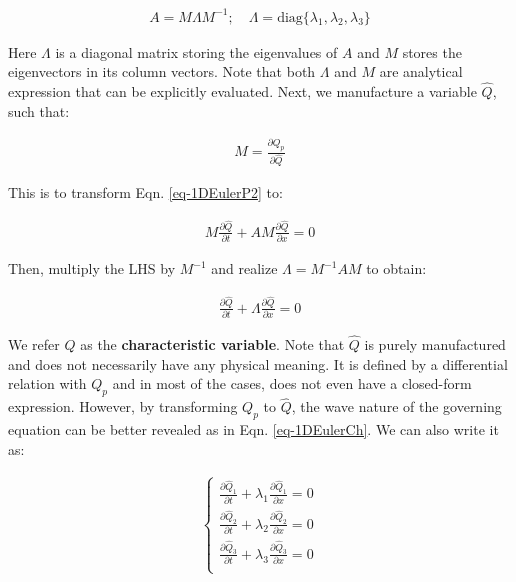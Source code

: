 \documentclass[12pt, letterpaper]{report}
\begin{document}
\begin{align*}
   A = M \Lambda M^{-1}; \quad \Lambda = \textrm{diag}\{\lambda_1, \lambda_2, \lambda_3\}
\end{align*}

Here $\Lambda$ is a diagonal matrix storing the eigenvalues of $A$ and $M$ stores the eigenvectors
in its column vectors. Note that both $\Lambda$ and $M$ are analytical expression that can be
explicitly evaluated. Next, we manufacture a variable $\widehat{Q}$, such that:

\begin{align*}
   M = \frac{\partial Q_p}{\partial \widehat{Q}}
\end{align*}

This is to transform Eqn. \ref{eq-1DEulerP2} to:

\begin{align*}
   M\frac{\partial \widehat{Q}}{\partial t} + AM\frac{\partial \widehat{Q}}{\partial x} = 0
\end{align*}

Then, multiply the LHS by $M^{-1}$ and realize $\Lambda = M^{-1}AM$ to obtain:

\begin{align}\label{eq-1DEulerCh}
   \frac{\partial \widehat{Q}}{\partial t} + \Lambda\frac{\partial \widehat{Q}}{\partial x} = 0
\end{align}

We refer $\widehat{Q}$ as the {\bf characteristic variable}. Note that $\widehat{Q}$ is purely
manufactured and does not necessarily have any physical meaning. It is defined by a differential
relation with $Q_p$ and in most of the cases, does not even have a closed-form expression. However,
by transforming $Q_p$ to $\widehat{Q}$, the wave nature of the governing equation can be better
revealed as in Eqn. \ref{eq-1DEulerCh}. We can also write it as: 

\begin{align*}
   \begin{cases}
      \frac{\partial \widehat{Q}_1}{\partial t} + \lambda_1 \frac{\partial \widehat{Q}_1}{\partial
      x} = 0 \\ 
      \frac{\partial \widehat{Q}_2}{\partial t} + \lambda_2 \frac{\partial
      \widehat{Q}_2}{\partial x} = 0 \\
      \frac{\partial \widehat{Q}_3}{\partial t} + \lambda_3 \frac{\partial
      \widehat{Q}_3}{\partial x} = 0 \\
   \end{cases}
\end{align*}
\end{document}
